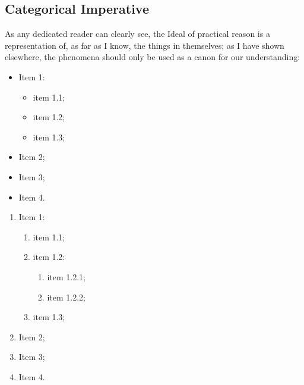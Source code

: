 \subsection{Categorical Imperative}
As any dedicated reader can clearly see, the Ideal of practical reason is a representation of, as far as I know, the things in themselves; as I have shown elsewhere, the phenomena should only be used as a canon for our understanding:
\begin{itemize}
	\item Item 1:
	\begin{itemize}[label=---]
		\item item 1.1;
		\item item 1.2;
		\item item 1.3;
	\end{itemize}
	\item Item 2;
	\item Item 3;
	\item Item 4.
\end{itemize}
\kant[2]
\begin{enumerate}
	\item Item 1:
	\begin{enumerate}
		\item item 1.1;
		\item item 1.2:
		\begin{enumerate}
			\item item 1.2.1;
			\item item 1.2.2;
		\end{enumerate}
		\item item 1.3;
	\end{enumerate}
	\item Item 2;
	\item Item 3;
	\item Item 4.
\end{enumerate}

\kant[9]

